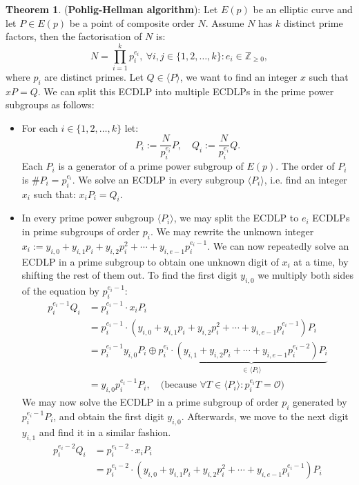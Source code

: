 \documentclass[thesis=M,english]{FITthesis}[2012/10/20]
\theoremstyle{remark}
\theoremstyle{definition}
\newtheorem{theorem}{Theorem}[section]
\begin{document}
\begin{theorem}(\textbf{Pohlig-Hellman algorithm}): Let $E(p)$ be an elliptic curve and let $P \in E(p)$ be a point of composite order $N$. Assume $N$ has $k$ distinct prime factors, then the factorisation of $N$ is:
$$
N = \prod_{i=1}^kp_i^{e_i},\ \forall i,j \in \{1, 2, \ldots, k\}: e_i \in \mathbb{Z}_{\geq 0},
$$ where $p_i$ are distinct primes. Let $Q \in \langle P \rangle$, we want to find an integer $x$ such that $xP = Q$. We can split this ECDLP into multiple ECDLPs in the prime power subgroups as follows:
 \begin{itemize}
 \item For each $i \in \{1, 2, \ldots, k\}$ let:
 $$
 P_i := \frac{N}{p_i^{e_i}}P, \quad Q_i := \frac{N}{p_i^{e_i}}Q.
 $$ Each $P_i$ is a generator of a prime power subgroup of $E(p)$. The order of $P_i$ is $\#P_i = p_i^{e_i}.$ We solve an ECDLP in every subgroup $\langle P_i \rangle$, i.e. find an integer $x_i$  such that: $x_iP_i = Q_i.$
 \item  In every prime power subgroup $\langle P_i \rangle$, we may split the ECDLP to $e_i$ ECDLPs in prime subgroups of order $p_i$.  We may rewrite the unknown integer $x_i := y_{i,0} + y_{i,1}p_i + y_{i,2}p_i^2+ \cdots + y_{i,e-1}p_i^{e_i-1}.$ We can now repeatedly solve an ECDLP in a prime subgroup to obtain one unknown digit of $x_i$ at a time, by shifting the rest of them out. To find the first digit $y_{i,0}$ we multiply both sides of the equation by $p_i^{e_i-1}$:
\begin{align*}
p_i^{e_i-1} Q_i &= p_i^{e_i-1}\cdot x_i  P_i\\ 
&= p_i^{e_i-1}\cdot (y_{i,0} + y_{i,1}p_i + y_{i,2}p_i^2+ \cdots + y_{i,e-1}p_i^{e_i-1})P_i \\
&= p_i^{e_i-1}y_{i,0}P_i \oplus p_i^{e_i}\cdot\underbrace{(y_{i,1} + y_{i,2}p_i+ \cdots + y_{i,e-1}p_i^{e_i-2})P_i}_{\in \langle P_i \rangle} \\
&= y_{i,0}p_i^{e_i-1}P_i, \quad \text{(because }\forall T \in \langle P_i \rangle : p_i^{e_i}T = \mathcal{O})
\end{align*}
We may now solve the ECDLP in a prime subgroup of order $p_i$ generated by $p_i^{e_i-1}P_i$, and obtain the first digit $y_{i,0}.$ Afterwards, we move to the next digit $y_{i,1}$ and find it in a similar fashion.
\begin{align*}
p_i^{e_i-2} Q_i &= p_i^{e_i-2}\cdot x_i  P_i\\ 
&= p_i^{e_i-2}\cdot (y_{i,0} + y_{i,1}p_i + y_{i,2}p_i^2+ \cdots + y_{i,e-1}p_i^{e_i-1})P_i \\

\end{align*}
\end{itemize}
\end{theorem}
\end{document}
